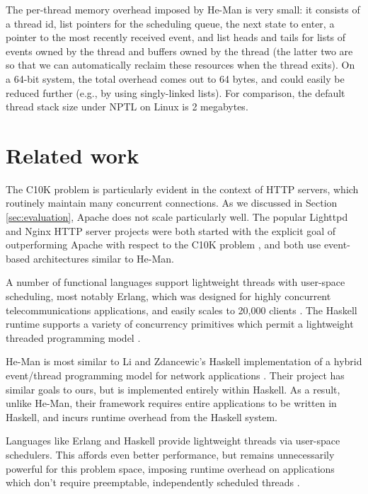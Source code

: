 \documentclass[preprint]{sigplanconf}
\begin{document}
The per-thread memory overhead imposed by He-Man is very small: it
consists of a thread id, list pointers for the scheduling queue, the
next state to enter, a pointer to the most recently received event,
and list heads and tails for lists of events owned by the thread and
buffers owned by the thread (the latter two are so that we can
automatically reclaim these resources when the thread exits). On a
64-bit system, the total overhead comes out to 64 bytes, and could
easily be reduced further (e.g., by using singly-linked lists).  For
comparison, the default thread stack size under NPTL on Linux is 2
megabytes.


\section{Related work}

The C10K problem is particularly evident in the context of HTTP
servers, which routinely maintain many concurrent connections. As we
discussed in Section \ref{sec:evaluation}, Apache does not scale
particularly well. The popular Lighttpd and Nginx HTTP server projects
were both started with the explicit goal of outperforming Apache with
respect to the C10K problem \cite{Lighttpd,Nginx}, and both use
event-based architectures similar to He-Man.

A number of functional languages support lightweight threads with
user-space scheduling, most notably Erlang, which was designed for
highly concurrent telecommunications applications, and easily scales
to 20,000 clients \cite{Hellstrom}. The Haskell runtime supports a
variety of concurrency primitives which permit a lightweight threaded
programming model \cite{LiEtAl}.


He-Man is most similar to Li and Zdancewic's Haskell implementation of
a hybrid event/thread programming model for network applications
\cite{LiZdancewic}.  Their project has similar goals to ours, but is
implemented entirely within Haskell. As a result, unlike He-Man, their
framework requires entire applications to be written in Haskell, and
incurs runtime overhead from the Haskell system.


Languages like Erlang and Haskell provide lightweight threads via user-space
schedulers. This affords even better performance, but remains unnecessarily
powerful for this problem space, imposing runtime overhead on applications which
don't require preemptable, independently scheduled threads \cite{Vinoski}.
\end{document}
